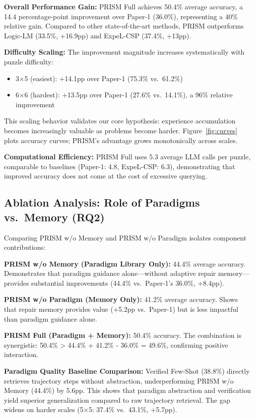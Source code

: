 \textbf{Overall Performance Gain:} PRISM Full achieves 50.4\% average accuracy, a 14.4 percentage-point improvement over Paper-1 (36.0\%), representing a 40\% relative gain. Compared to other state-of-the-art methods, PRISM outperforms Logic-LM (33.5\%, +16.9pp) and ExpeL-CSP (37.4\%, +13pp).

\textbf{Difficulty Scaling:} The improvement magnitude increases systematically with puzzle difficulty:
\begin{itemize}
    \item 3×5 (easiest): +14.1pp over Paper-1 (75.3\% vs.\ 61.2\%)
    \item 6×6 (hardest): +13.5pp over Paper-1 (27.6\% vs.\ 14.1\%), a 96\% relative improvement
\end{itemize}

This scaling behavior validates our core hypothesis: experience accumulation becomes increasingly valuable as problems become harder. Figure~\ref{fig:curves} plots accuracy curves; PRISM's advantage grows monotonically across scales.

\textbf{Computational Efficiency:} PRISM Full uses 5.3 average LLM calls per puzzle, comparable to baselines (Paper-1: 4.8, ExpeL-CSP: 6.3), demonstrating that improved accuracy does not come at the cost of excessive querying.

\subsection{Ablation Analysis: Role of Paradigms vs.\ Memory (RQ2)}

Comparing PRISM w/o Memory and PRISM w/o Paradigm isolates component contributions:

\textbf{PRISM w/o Memory (Paradigm Library Only):} 44.4\% average accuracy. Demonstrates that paradigm guidance alone—without adaptive repair memory—provides substantial improvements (44.4\% vs.\ Paper-1's 36.0\%, +8.4pp).

\textbf{PRISM w/o Paradigm (Memory Only):} 41.2\% average accuracy. Shows that repair memory provides value (+5.2pp vs.\ Paper-1) but is less impactful than paradigm guidance alone.

\textbf{PRISM Full (Paradigm + Memory):} 50.4\% accuracy. The combination is synergistic: 50.4\% > 44.4\% + 41.2\% - 36.0\% = 49.6\%, confirming positive interaction.

\textbf{Paradigm Quality Baseline Comparison:} Verified Few-Shot (38.8\%) directly retrieves trajectory steps without abstraction, underperforming PRISM w/o Memory (44.4\%) by 5.6pp. This shows that paradigm abstraction and verification yield superior generalization compared to raw trajectory retrieval. The gap widens on harder scales (5×5: 37.4\% vs.\ 43.1\%, +5.7pp).

